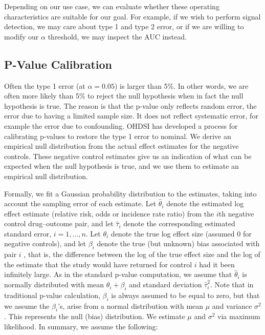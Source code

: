 \documentclass[11pt]{book}
\theoremstyle{definition}
\theoremstyle{definition}
\theoremstyle{definition}
\theoremstyle{remark}
\begin{document}
Depending on our use case, we can evaluate whether these operating
characteristics are suitable for our goal. For example, if we wish to
perform signal detection, we may care about type 1 and type 2 error, or
if we are willing to modify our \(\alpha\) threshold, we may inspect the
AUC instead.

\subsection{P-Value Calibration}\label{p-value-calibration}

 

Often the type 1 error (at \(\alpha = 0.05\)) is larger than 5\%. In
other words, we are often more likely than 5\% to reject the null
hypothesis when in fact the null hypothesis is true. The reason is that
the p-value only reflects random error, the error due to having a
limited sample size. It does not reflect systematic error, for example
the error due to confounding. OHDSI has developed a process for
calibrating p-values to restore the type 1 error to nominal.
\citep{schuemie_2014} We derive an empirical null distribution from the
actual effect estimates for the negative controls. These negative
control estimates give us an indication of what can be expected when the
null hypothesis is true, and we use them to estimate an empirical null
distribution.

Formally, we fit a Gaussian probability distribution to the estimates,
taking into account the sampling error of each estimate. Let
\(\hat{\theta}_i\) denote the estimated log effect estimate (relative
risk, odds or incidence rate ratio) from the \(i\)th negative control
drug--outcome pair, and let \(\hat{\tau}_i\) denote the corresponding
estimated standard error, \(i=1,\ldots,n\). Let \(\theta_i\) denote the
true log effect size (assumed 0 for negative controls), and let
\(\beta_i\) denote the true (but unknown) bias associated with pair
\(i\) , that is, the difference between the log of the true effect size
and the log of the estimate that the study would have returned for
control \(i\) had it been infinitely large. As in the standard p-value
computation, we assume that \(\hat{\theta}_i\) is normally distributed
with mean \(\theta_i + \beta_i\) and standard deviation
\(\hat{\tau}_i^2\). Note that in traditional p-value calculation,
\(\beta_i\) is always assumed to be equal to zero, but that we assume
the \(\beta_i\)'s, arise from a normal distribution with mean \(\mu\)
and variance \(\sigma^2\). This represents the null (bias) distribution.
We estimate \(\mu\) and \(\sigma^2\) via maximum likelihood. In summary,
we assume the following:
\end{document}
